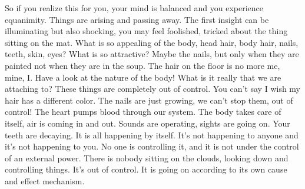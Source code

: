 \documentclass[letterpaper,10pt,english]{sphinxmanual}
\begin{document}
\sphinxAtStartPar
So if you realize this for you, your mind is balanced and you experience equanimity. Things are arising and passing away. The first insight can
be illuminating but also shocking, you may feel foolished, tricked about the
thing sitting on the mat. What is so appealing of the body, head hair, body
hair, nails, teeth, skin, eyes? What is so attractive? Maybe the nails, but only
when they are painted not when they are in the soup. The hair on the floor is
no more me, mine, I. Have a look at the nature of the body! What is it really
that  we  are  attaching  to? These  things  are  completely  out  of  control. You
can’t say I wish my hair has a different color. The nails are just growing, we
can’t stop them, out of control! The heart pumps blood through our system.
The body takes care of itself, air is coming in and out. Sounds are operating,
  sights are going on. Your teeth are decaying. It is all happening by itself. It’s
not happening to anyone and it’s not happening to you. No one is controlling
it, and it is not under the control of an external power. There is nobody sitting on the clouds, looking down and controlling things. It’s out of control.
It is going on according to its own cause and effect mechanism.
\end{document}
